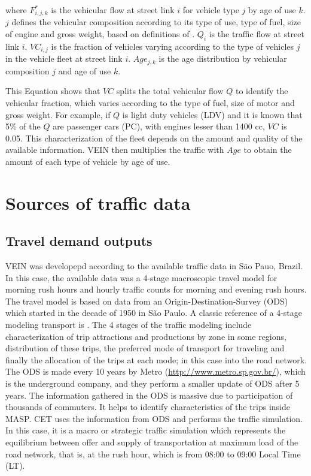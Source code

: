 \documentclass[12pt,graybox,envcountchap,sectrefs]{krantz}
\theoremstyle{definition}
\theoremstyle{definition}
\theoremstyle{definition}
\theoremstyle{remark}
\begin{document}
where \(F^*_{i,j,k}\) is the vehicular flow at street link \(i\) for
vehicle type \(j\) by age of use \(k\). \(j\) defines the vehicular
composition according to its type of use, type of fuel, size of engine
and gross weight, based on definitions of \citep{Corvalanetal2002}.
\(Q_i\) is the traffic flow at street link \(i\). \(VC_{i,j}\) is the
fraction of vehicles varying according to the type of vehicles \(j\) in
the vehicle fleet at street link \(i\). \(Age_{j,k}\) is the age
distribution by vehicular composition \(j\) and age of use \(k\).

This Equation shows that \(VC\) splits the total vehicular flow \(Q\) to
identify the vehicular fraction, which varies according to the type of
fuel, size of motor and gross weight. For example, if \(Q\) is light
duty vehicles (LDV) and it is known that 5\% of the \(Q\) are passenger
cars (PC), with engines lesser than 1400 cc, \(VC\) is 0.05. This
characterization of the fleet depends on the amount and quality of the
available information. VEIN then multiplies the traffic with \(Age\) to
obtain the amount of each type of vehicle by age of use.

\section{Sources of traffic data}\label{sources-of-traffic-data}

\subsection{Travel demand outputs}\label{travel-demand-outputs}

VEIN was developepd according to the available traffic data in São Pauo,
Brazil. In this case, the available data was a 4-stage macroscopic
travel model for morning rush hours and hourly traffic counts for
morning and evening rush hours. The travel model is based on data from
an Origin-Destination-Survey (ODS) \citep{ODS} which started in the
decade of 1950 in São Paulo. A classic reference of a 4-stage modeling
transport is \citep{OrtuzarWillumsen2002}. The 4 stages of the traffic
modeling include characterization of trip attractions and productions by
zone in some regions, distribution of these trips, the preferred mode of
transport for traveling and finally the allocation of the trips at each
mode; in this case into the road network. The ODS is made every 10 years
by Metro (\url{http://www.metro.sp.gov.br/}), which is the underground
company, and they perform a smaller update of ODS after 5 years. The
information gathered in the ODS is massive due to participation of
thousands of commuters. It helps to identify characteristics of the
trips inside MASP. CET uses the information from ODS and performs the
traffic simulation. In this case, it is a macro or strategic traffic
simulation which represents the equilibrium between offer and supply of
transportation at maximum load of the road network, that is, at the rush
hour, which is from 08:00 to 09:00 Local Time (LT).
\end{document}
